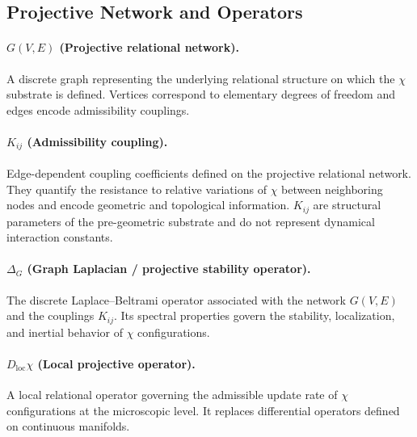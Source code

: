 \subsection{Projective Network and Operators}
  \label{subsec:relaxation-network-and-operators}

  \paragraph{\texorpdfstring{$G(V,E)$}{G(V,E)} (Projective relational network).}
    A discrete graph representing the underlying relational structure on which the
    $\chi$ substrate is defined.
    Vertices correspond to elementary degrees of freedom and edges encode admissibility
    couplings.

  \paragraph{\texorpdfstring{$K_{ij}$}{Kij} (Admissibility coupling).}
    Edge-dependent coupling coefficients defined on the projective relational network.
    They quantify the resistance to relative variations of $\chi$ between
    neighboring nodes and encode geometric and topological information.
    $K_{ij}$ are structural parameters of the pre-geometric substrate and do not
    represent dynamical interaction constants.

  \paragraph{\texorpdfstring{$\Delta_G$}{ΔG} (Graph Laplacian / projective stability operator).}
    The discrete Laplace--Beltrami operator associated with the network $G(V,E)$ and
    the couplings $K_{ij}$.
    Its spectral properties govern the stability, localization, and inertial
    behavior of $\chi$ configurations.

  \paragraph{\texorpdfstring{$D_{\mathrm{loc}}\chi$}{Dlocχ} (Local projective operator).}
    A local relational operator governing the admissible update rate of $\chi$
    configurations at the microscopic level.
    It replaces differential operators defined on continuous manifolds.
